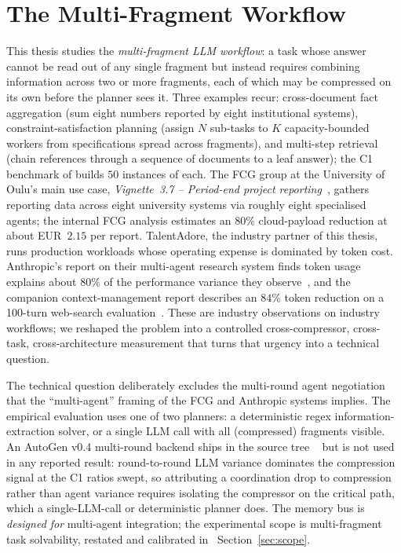 \section{The Multi-Fragment Workflow}
\label{sec:multi_fragment}

This thesis studies the \emph{multi-fragment LLM workflow}: a task
whose answer cannot be read out of any single fragment but instead
requires combining information across two or more fragments, each of
which may be compressed on its own before the planner sees it. Three
examples recur: cross-document fact aggregation (sum eight numbers
reported by eight institutional systems), constraint-satisfaction
planning (assign $N$ sub-tasks to $K$ capacity-bounded workers from
specifications spread across fragments), and multi-step retrieval
(chain references through a sequence of documents to a leaf answer);
the C1 benchmark of  builds $50$ instances of
each.  The FCG group at the
University of Oulu's main use case,
\emph{Vignette~3.7 -- Period-end project reporting}~\cite{fcgusecase2026},
gathers reporting data across eight university systems via roughly
eight specialised agents; the internal FCG analysis estimates an
$80\%$ cloud-payload reduction at about EUR~$2.15$ per report.
TalentAdore, the industry partner of this thesis, runs production
workloads whose operating expense is dominated by token cost.
Anthropic's report on their multi-agent research system finds token
usage explains about $80\%$ of the performance variance they
observe~\cite{anthropic2025multiagent}, and the companion
context-management report describes an $84\%$ token reduction on a
100-turn web-search evaluation~\cite{anthropic2025contextediting}.
These are industry observations on industry workflows; we reshaped the problem into a controlled cross-compressor,
cross-task, cross-architecture measurement that turns that urgency
into a technical question.

The technical question deliberately excludes the multi-round agent
negotiation that the ``multi-agent'' framing of the FCG and Anthropic
systems implies. The empirical evaluation uses one of two planners: a
deterministic regex information-extraction solver, or a single LLM
call with all (compressed) fragments visible. An AutoGen v0.4
multi-round backend ships in the source tree
~\cite{wu2023autogen} but is not used
in any reported result: round-to-round LLM
variance dominates the compression signal at the C1 ratios swept, so
attributing a coordination drop to compression rather than agent
variance requires isolating the compressor on the critical
path, which a single-LLM-call or deterministic planner does. The
memory bus is \emph{designed for} multi-agent integration; the
experimental scope is multi-fragment task solvability, restated and
calibrated in ~Section~\ref{sec:scope}.

